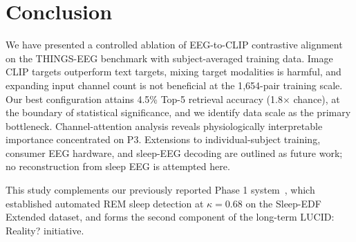 \documentclass[conference]{IEEEtran}
\begin{document}
\section{Conclusion}

We have presented a controlled ablation of
EEG-to-CLIP contrastive alignment on the
THINGS-EEG benchmark with subject-averaged
training data. Image CLIP targets
outperform text targets, mixing target
modalities is harmful, and expanding input
channel count is not beneficial at the
1{,}654-pair training scale. Our best
configuration attains 4.5\% Top-5
retrieval accuracy (1.8$\times$ chance),
at the boundary of statistical significance,
and we identify data scale as the primary
bottleneck. Channel-attention analysis
reveals physiologically interpretable
importance concentrated on P3. Extensions
to individual-subject training, consumer
EEG hardware, and sleep-EEG decoding are
outlined as future work; no reconstruction
from sleep EEG is attempted here.

This study complements our previously reported
Phase 1 system~\cite{sharma2026}, which established
automated REM sleep detection at $\kappa{=}0.68$
on the Sleep-EDF Extended dataset, and forms the
second component of the long-term LUCID: Reality?
initiative.



\end{document}
